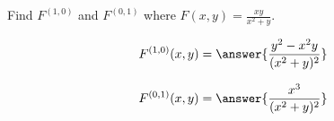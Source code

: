 \documentclass{ximera}
\author{David Guichard \and Neal Koblitz \and H. Jerome Keisler \and Albert Scheller \and Barry Balof \and Mike Wills \and Matthew Carr}
\begin{document}
\begin{exercise}




Find $F^{(1,0)}$ and $F^{(0,1)}$ where $F(x,y)=\frac{xy}{x^2+y}$.

\begin{prompt}
\[
F^{(1,0)}(x,y)=\answer{\frac{y^2-x^2 y}{(x^2+y)^2}}
\]
\end{prompt}

\begin{prompt}
\[
F^{(0,1)}(x,y)=\answer{\frac{x^3}{(x^2+y)^2}}
\]
\end{prompt}

\end{exercise}
\end{document}
